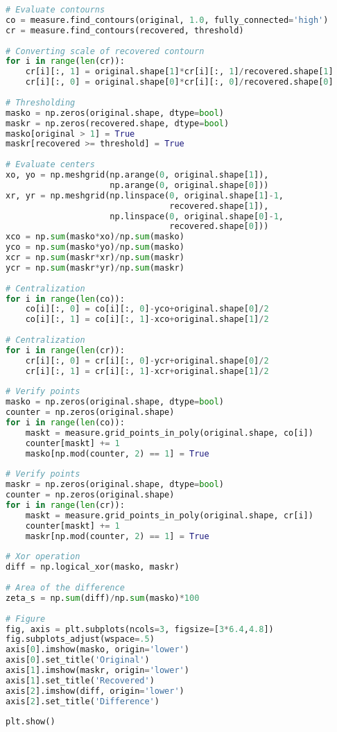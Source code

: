 \begin{lstlisting}[language=Python]
# Evaluate contourns
co = measure.find_contours(original, 1.0, fully_connected='high')
cr = measure.find_contours(recovered, threshold)
			
# Converting scale of recovered contourn
for i in range(len(cr)):
    cr[i][:, 1] = original.shape[1]*cr[i][:, 1]/recovered.shape[1]
    cr[i][:, 0] = original.shape[0]*cr[i][:, 0]/recovered.shape[0]
			
# Thresholding
masko = np.zeros(original.shape, dtype=bool)
maskr = np.zeros(recovered.shape, dtype=bool)
masko[original > 1] = True
maskr[recovered >= threshold] = True
			
# Evaluate centers
xo, yo = np.meshgrid(np.arange(0, original.shape[1]),
                     np.arange(0, original.shape[0]))
xr, yr = np.meshgrid(np.linspace(0, original.shape[1]-1, 
                                 recovered.shape[1]),
                     np.linspace(0, original.shape[0]-1,
                                 recovered.shape[0]))
xco = np.sum(masko*xo)/np.sum(masko)
yco = np.sum(masko*yo)/np.sum(masko)
xcr = np.sum(maskr*xr)/np.sum(maskr)
ycr = np.sum(maskr*yr)/np.sum(maskr)
			
# Centralization
for i in range(len(co)):
    co[i][:, 0] = co[i][:, 0]-yco+original.shape[0]/2
    co[i][:, 1] = co[i][:, 1]-xco+original.shape[1]/2
			
# Centralization
for i in range(len(cr)):
    cr[i][:, 0] = cr[i][:, 0]-ycr+original.shape[0]/2
    cr[i][:, 1] = cr[i][:, 1]-xcr+original.shape[1]/2
			
# Verify points
masko = np.zeros(original.shape, dtype=bool)
counter = np.zeros(original.shape)
for i in range(len(co)):
    maskt = measure.grid_points_in_poly(original.shape, co[i])
    counter[maskt] += 1
    masko[np.mod(counter, 2) == 1] = True
			
# Verify points
maskr = np.zeros(original.shape, dtype=bool)
counter = np.zeros(original.shape)
for i in range(len(cr)):
    maskt = measure.grid_points_in_poly(original.shape, cr[i])
    counter[maskt] += 1
    maskr[np.mod(counter, 2) == 1] = True
			
# Xor operation
diff = np.logical_xor(masko, maskr)
			
# Area of the difference
zeta_s = np.sum(diff)/np.sum(masko)*100
			
# Figure
fig, axis = plt.subplots(ncols=3, figsize=[3*6.4,4.8])
fig.subplots_adjust(wspace=.5)
axis[0].imshow(masko, origin='lower')
axis[0].set_title('Original')
axis[1].imshow(maskr, origin='lower')
axis[1].set_title('Recovered')
axis[2].imshow(diff, origin='lower')
axis[2].set_title('Difference')
			
plt.show()
\end{lstlisting}
